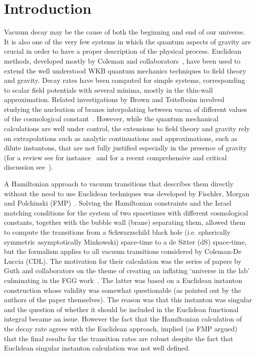 \documentclass[a4paper,11pt]{article}
\numberwithin{equation}{section}
\begin{document}
\tableofcontents

\newpage 











\section{Introduction}
\label{sec:Introduction}



Vacuum decay may  be the cause of both the beginning and end of our universe. It is also  one of the very few  systems in which the quantum aspects of gravity are crucial in order to have a proper description of the physical process. Euclidean methods, developed mostly by Coleman and collaborators~\cite{Coleman:1977py, Callan:1977pt, Coleman:1980aw}, have been used to extend the well understood WKB quantum mechanics techniques  to field theory and gravity. Decay rates have been computed for simple systems, corresponding to scalar field potentials with several minima, mostly in the thin-wall approximation. Related investigations by Brown and Teitelboim involved studying the nucleation of branes interpolating between vacua of different values of the cosmological constant~\cite{Brown:1988kg}. However, while the quantum mechanical calculations are well under  control, the extensions to field theory and gravity rely on  extrapolations such as analytic continuations and approximations, such as dilute instantons, that are not fully justified especially in the presence of gravity (for a review see for instance~\cite{Weinberg:2012pjx} and for a recent comprehensive and critical discussion see~\cite{Andreassen:2016cvx}).

A Hamiltonian approach to vacuum transitions that describes them directly without the need to use Euclidean techniques was developed by Fischler, Morgan and Polchinski (FMP)~\cite{Fischler:1989se,Fischler:1990pk}. Solving the Hamiltonian constraints and the Israel matching conditions for the system of two spacetimes with different cosmological constants, together with the bubble  wall (brane) separating them,  allowed them to compute the transitions from a Schwarzschild black hole (i.e. spherically symmetric asymptotically Minkowski) space-time to a de Sitter (dS)  space-time, but the formalism applies to all vacuum transitions considered by Coleman-De Luccia (CDL). The motivation for their calculation was the series of papers by Guth and collaborators on the theme of creating an inflating ‘universe in the lab’ culminating in the FGG work~\cite{Farhi:1989yr}. The latter was based on a Euclidean instanton construction whose validity was somewhat questionable (as pointed out by the authors of the paper themselves). The reason was that this instanton  was singular and the question of whether it should be included in the Euclidean functional integral became an issue. However the  fact that the Hamiltonian calculation of the decay rate agrees with the Euclidean approach, implied (as FMP argued)  that the final results for the transition rates are robust despite the fact that  Euclidean singular instanton calculation was not well defined.
\end{document}
